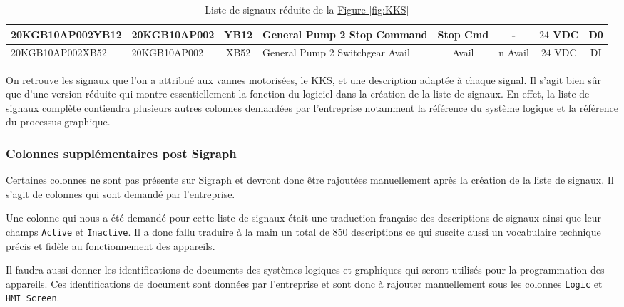 \documentclass[11pt, openright]{book}
\begin{document}
\begin{table}[ht!]
{\begin{tabular}{|l|l|c|l|c|c|c|c|}
            \hline
            20KGB10AP002YB12             & 20KGB10AP002                & YB12                                                       & General Pump 2  Stop Command                                                  & Stop Cmd             & -                    & $24$ VDC                                            & D0                                          \\
            \hline
            20KGB10AP002XB52             & 20KGB10AP002                & XB52                                                       & General Pump 2  Switchgear Avail                                              & Avail                & n Avail              & $24$ VDC                                            & DI                                          \\
            \hline
        \end{tabular}}
    \label{fig:IOlist}
    \caption{Liste de signaux réduite de la \hyperref[fig:KKS]{Figure \ref{fig:KKS}}}
\end{table}


On retrouve les signaux que l'on a attribué aux vannes motorisées, le KKS, et une description adaptée à chaque signal. Il s'agit bien sûr que d'une version réduite qui montre essentiellement la fonction du logiciel dans la création de la liste de signaux. En effet, la liste de signaux complète contiendra plusieurs autres colonnes demandées par l'entreprise notamment la référence du système logique et la référence du processus graphique.

\subsubsection{Colonnes supplémentaires post Sigraph}

Certaines colonnes ne sont pas présente sur Sigraph et devront donc être rajoutées manuellement après la création de la liste de signaux. Il s'agit de colonnes qui sont demandé par l'entreprise.

Une colonne qui nous a été demandé pour cette liste de signaux était une traduction française des descriptions de signaux ainsi que leur champs \texttt{Active} et \texttt{Inactive}. Il a donc fallu traduire à la main un total de 850 descriptions ce qui suscite aussi un vocabulaire technique précis et fidèle au fonctionnement des appareils.

Il faudra aussi donner les identifications de documents des systèmes logiques et graphiques qui seront utilisés pour la programmation des appareils. Ces identifications de document sont données par l'entreprise et sont donc à rajouter manuellement sous les colonnes \texttt{Logic} et \texttt{HMI Screen}.
\end{document}
